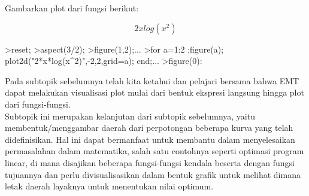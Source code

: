 \documentclass{article}
\begin{document}
\begin{eulernotebook}
\begin{eulercomment}
Gambarkan plot dari fungsi berikut:\\
\end{eulercomment}
\begin{eulerformula}
\[
2xlog(x^2)
\]
\end{eulerformula}
\begin{eulerprompt}
>reset;
>aspect(3/2); 
>figure(1,2);...
>for a=1:2 ;figure(a); plot2d("2*x*log(x^2)",-2,2,grid=a); end;...  
>figure(0):
\end{eulerprompt}
\begin{eulercomment}
\end{eulercomment}
\eulersubheading{}
\begin{eulercomment}
Pada subtopik sebelumnya telah kita ketahui dan pelajari bersama bahwa
EMT dapat melakukan visualisasi plot mulai dari bentuk ekspresi
langsung hingga plot dari fungsi-fungsi.\\
Subtopik ini merupakan kelanjutan dari subtopik sebelumnya, yaitu
membentuk/menggambar daerah dari perpotongan beberapa kurva yang telah
didefinisikan. Hal ini dapat bermanfaat untuk membantu dalam
menyelesaikan permasalahan dalam matematika, salah satu contohnya
seperti optimasi program linear, di mana disajikan beberapa
fungsi-fungsi kendala beserta dengan fungsi tujuannya dan perlu
divisualisasikan dalam bentuk grafik untuk melihat dimana letak daerah
layaknya untuk menentukan nilai optimum.


\end{eulercomment}
\end{eulernotebook}
\end{document}
